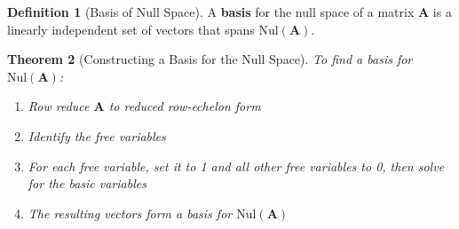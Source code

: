 \documentclass[12pt]{article}
\numberwithin{equation}{section}
\newcommand{\mat}[1]{\mathbf{#1}}        %
\theoremstyle{plain}
\newtheorem{theorem}{Theorem}[section]
\theoremstyle{definition}
\newtheorem{definition}[theorem]{Definition}
\theoremstyle{remark}
\begin{document}
\begin{definition}[Basis of Null Space]
A \textbf{basis} for the null space of a matrix $\mat{A}$ is a linearly independent set of vectors that spans $\text{Nul}(\mat{A})$.
\end{definition}

\begin{theorem}[Constructing a Basis for the Null Space]
To find a basis for $\text{Nul}(\mat{A})$:
\begin{enumerate}
\item Row reduce $\mat{A}$ to reduced row-echelon form
\item Identify the free variables
\item For each free variable, set it to 1 and all other free variables to 0, then solve for the basic variables
\item The resulting vectors form a basis for $\text{Nul}(\mat{A})$
\end{enumerate}
\end{theorem}
\end{document}
